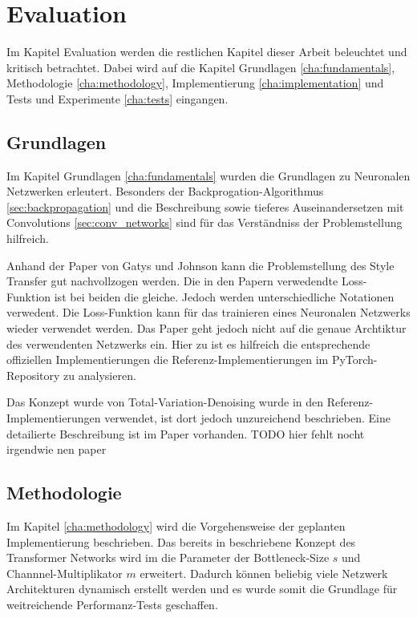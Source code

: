 \chapter{Evaluation}

Im Kapitel Evaluation werden die restlichen Kapitel dieser Arbeit beleuchtet und kritisch betrachtet. Dabei wird auf die Kapitel Grundlagen \ref{cha:fundamentals}, Methodologie \ref{cha:methodology}, Implementierung \ref{cha:implementation} und Tests und Experimente \ref{cha:tests} eingangen.

\section{Grundlagen}

Im Kapitel Grundlagen \ref{cha:fundamentals} wurden die Grundlagen zu Neuronalen Netzwerken erleutert. Besonders der Backprogation-Algorithmus \ref{sec:backpropagation} und die Beschreibung sowie tieferes Auseinandersetzen mit Convolutions \ref{sec:conv_networks} sind für das Verständniss der Problemstellung hilfreich.

Anhand der Paper von Gatys \cite{DBLP:journals/corr/GatysEB15a} und Johnson \cite{DBLP:journals/corr/JohnsonAL16} kann die Problemstellung des Style Transfer gut nachvollzogen werden. Die in den Papern verwedendte Loss-Funktion ist bei beiden die gleiche. Jedoch werden unterschiedliche Notationen verwedent.
Die Loss-Funktion kann für das trainieren eines Neuronalen Netzwerks wieder verwendet werden. Das Paper \cite{DBLP:journals/corr/JohnsonAL16} geht jedoch nicht auf die genaue Archtiktur des verwendenten Netzwerks ein. Hier zu ist es hilfreich die entsprechende offiziellen Implementierungen die Referenz-Implementierungen im PyTorch-Repository zu analysieren.

Das Konzept wurde von Total-Variation-Denoising wurde in den Referenz-Implementierungen verwendet, ist dort jedoch unzureichend beschrieben. Eine detailierte Beschreibung ist im Paper \cite{Rudin1992NonlinearTV} vorhanden. TODO hier fehlt nocht irgendwie nen paper

\section{Methodologie}

Im Kapitel \ref{cha:methodology} wird die Vorgehensweise der geplanten Implementierung beschrieben. Das bereits in \cite{DBLP:journals/corr/JohnsonAL16} beschriebene Konzept des Transformer Networks wird im die Parameter der Bottleneck-Size $ s $ und Channnel-Multiplikator $ m $ erweitert. Dadurch können beliebig viele Netzwerk Architekturen dynamisch erstellt werden und es wurde somit die Grundlage für weitreichende Performanz-Tests geschaffen.

